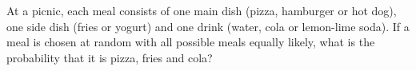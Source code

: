 At a picnic, each meal consists of one main dish (pizza, hamburger or hot dog), one side dish (fries or yogurt) and one drink (water, cola or lemon-lime soda). If a meal is chosen at random with all possible meals equally likely, what is the probability that it is pizza, fries and cola?

